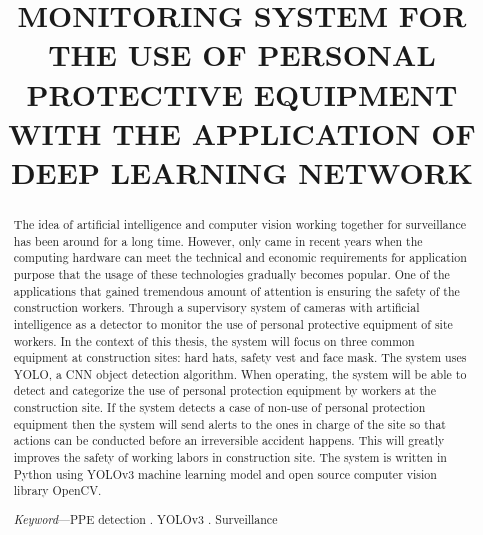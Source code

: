 \documentclass[conference]{IEEEtran}
\begin{document}
\title{MONITORING SYSTEM FOR THE USE OF PERSONAL PROTECTIVE EQUIPMENT WITH THE APPLICATION OF DEEP LEARNING NETWORK}

\author{
}

\maketitle
\begin{abstract}
The idea of artificial intelligence and computer vision working together for surveillance has been around for a long time. However, only came in recent years when the computing hardware can meet the technical and economic requirements for application purpose that the usage of these technologies gradually becomes popular. One of the applications that gained tremendous amount of attention is ensuring the safety of the construction workers. Through a supervisory system of cameras with artificial intelligence as a detector to monitor the use of personal protective equipment of site workers. In the context of this thesis, the system will focus on three common equipment at construction sites: hard hats, safety vest and face mask. The system uses YOLO, a CNN object detection algorithm. When operating, the system will be able to detect and categorize the use of personal protection equipment by workers at the construction site. If the system detects a case of non-use of personal protection equipment then the system will send alerts to the ones in charge of the site so that actions can be conducted before an irreversible accident happens. This will greatly improves the safety of working labors in construction site. The system is written in Python using YOLOv3 machine learning model and open source computer vision library OpenCV.

\textit{Keyword}—PPE detection . YOLOv3 . Surveillance
\end{abstract}
\end{document}
